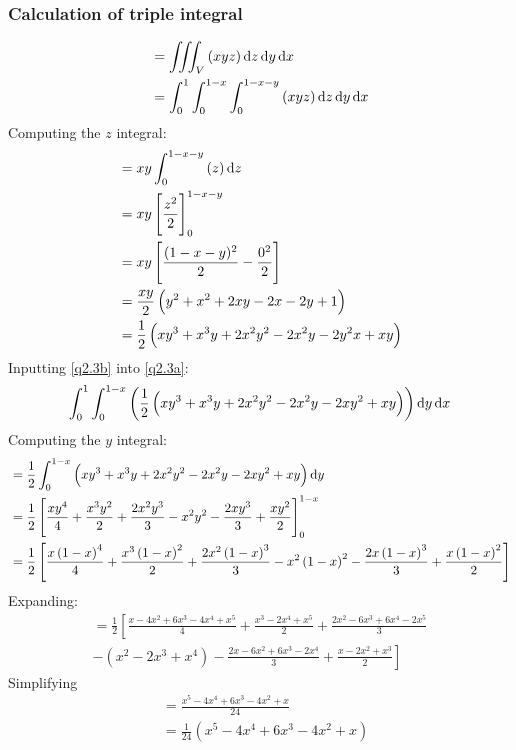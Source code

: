 \documentclass[11pt]{article}
\numberwithin{equation}{section}
\begin{document}
\subsubsection{Calculation of triple integral}
\begin{align}
    &= \iiint_V \left(xyz\right)\dif z \dif y \dif x\\
    &= \int_0^1 \int_0^{1-x} \int_0^{1-x-y} \left(xyz\right)\dif z \dif y \dif x \label{q2.3a}
\end{align}
Computing the $z$ integral:
\begin{align}
    &= xy\int_0^{1-x-y} \left(z\right)\dif z\\
    &= xy \left[\frac{z^2}{2}\right]_0^{1-x-y}\\
    &= xy \left[\frac{(1-x-y)^2}{2}-\frac{0^2}{2}\right]\\
    &= \frac{xy}{2} \left(y^2 + x^2 + 2xy -2x -2y + 1\right)\\
    &= \frac{1}{2}\left(xy^3 + x^3y + 2x^2 y^2 -2x^2y - 2y^2x + xy\right) \label{q2.3b}
\end{align}
Inputting \ref{q2.3b} into \ref{q2.3a}:
\begin{align}
    \int_0^1 \int_0^{1-x} \left(\frac{1}{2}\left(xy^3 + x^3y + 2x^2 y^2 -2x^2y - 2xy^2 + xy\right) \right)\dif y \dif x \label{q2.3d}
\end{align}
Computing the $y$ integral:
\begin{align}
    &= \frac{1}{2} \int_0^{1-x}\left(xy^3 + x^3y + 2x^2 y^2 -2x^2y - 2xy^2 + xy\right) \dif y\\
    &= \frac{1}{2}\left[\frac{xy^4}{4} + \frac{x^3y^2}{2} + \frac{2x^2y^3}{3} -x^2y^2-\frac{2xy^3}{3}+ \frac{xy^2}{2}\right]_0^{1-x}\\
    &= \frac{1}{2}\left[\frac{x\left(1-x\right)^4}{4} + \frac{x^3\left(1-x\right)^2}{2} + \frac{2x^2\left(1-x\right)^3}{3} -x^2\left(1-x\right)^2-\frac{2x\left(1-x\right)^3}{3}+ \frac{x\left(1-x\right)^2}{2}\right]
\end{align}
Expanding:
\begin{multline}
    = \frac{1}{2}\left[\frac{x - 4x^2 + 6x^3 - 4x^4 + x^5}{4} \right.+ \frac{x^3 - 2x^4 + x^5}{2} + \frac{2x^2-6x^3 + 6x^4 -2x^5}{3}\\ \left. -\left(x^2-2x^3+x^4\right)-\frac{2x-6x^2 +6x^3 -2x^4}{3}+ \frac{x-2x^2 + x^3}{2}\right]
\end{multline}
Simplifying
\begin{align}
    &= \frac{x^5 -4x^4 + 6x^3 -4x^2 + x}{24}\\
    &= \frac{1}{24}\left(x^5 -4x^4 +6x^3 -4x^2 + x\right) \label{q2.3c}
\end{align}
\end{document}
